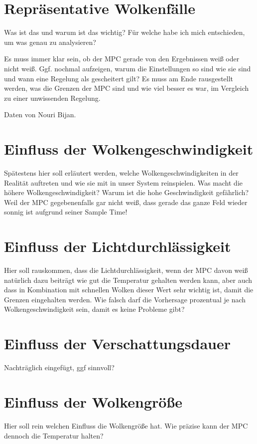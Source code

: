 \section{Repräsentative Wolkenfälle} \label{sec_Wolkenfälle}
Was ist das und warum ist das wichtig?
Für welche habe ich mich entschieden, um was genau zu analysieren?

Es muss immer klar sein, ob der MPC gerade von den Ergebnissen weiß oder nicht weiß.
Ggf. nochmal aufzeigen, warum die Einstellungen so sind wie sie sind und wann eine Regelung als gescheitert gilt?
Es muss am Ende rausgestellt werden, was die Grenzen der MPC sind und wie viel besser es war, im Vergleich zu einer unwissenden Regelung.

Daten von Nouri Bijan.



\section{Einfluss der Wolkengeschwindigkeit} \label{sec_EinflussGeschwindigkeit}
Spätestens hier soll erläutert werden, welche Wolkengeschwindigkeiten in der Realität auftreten und wie sie mit in unser System reinspielen.
Was macht die höhere Wolkengeschwindigkeit? Warum ist die hohe Geschwindigkeit gefährlich?
Weil der MPC gegebenenfalls gar nicht weiß, dass gerade das ganze Feld wieder sonnig ist aufgrund seiner Sample Time!

\section{Einfluss der Lichtdurchlässigkeit} \label{sec_EinflussLichtdurchlässigkeit}
Hier soll rauskommen, dass die Lichtdurchlässigkeit, wenn der MPC davon weiß natürlich dazu beiträgt wie gut die Temperatur gehalten werden kann, aber auch dass in Kombination mit schnellen Wolken dieser Wert sehr wichtig ist, damit die Grenzen eingehalten werden.
Wie falsch darf die Vorhersage prozentual je nach Wolkengeschwindigkeit sein, damit es keine Probleme gibt?

\section{Einfluss der Verschattungsdauer} \label{sec_Verschattungsdauer}
Nachträglich eingefügt, ggf sinnvoll?

\section{Einfluss der Wolkengröße} \label{sec_EinflussGröße}
Hier soll rein welchen Einfluss die Wolkengröße hat.
Wie präzise kann der MPC dennoch die Temperatur halten?

